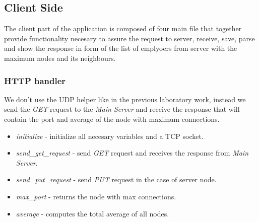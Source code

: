 \documentclass[12pt]{article}
\begin{document}
    \subsection{Client Side}

    The client part of the application is composed of four main file that together provide functionality
    necesary to assure the request to server, receive, save, parse and show the response in form of the
    list of emplyoers from server with the maximum nodes and its neighbours.

    \subsubsection{HTTP handler}

    We don't use the UDP helper like in the previous laboratory work, instead we send the \textit{GET} request
    to the \textit{Main Server} and receive the response that will contain the port and average of the node with
    maximum connections.

    \begin{itemize}
      \renewcommand{\labelitemi}{$\circ$}
      \item  \textit{initialize} - initialize all necesary variables and a TCP socket.
      \item \textit{send\_get\_request} - send \textit{GET} request and receives the response from \textit{Main Server}.
      \item \textit{send\_put\_request} - send \textit{PUT} request in the case of server node.
      \item \textit{max\_port} - returns the node with max connections.
      \item \textit{average} - computes the total average of all nodes.
    \end{itemize}
\end{document}
